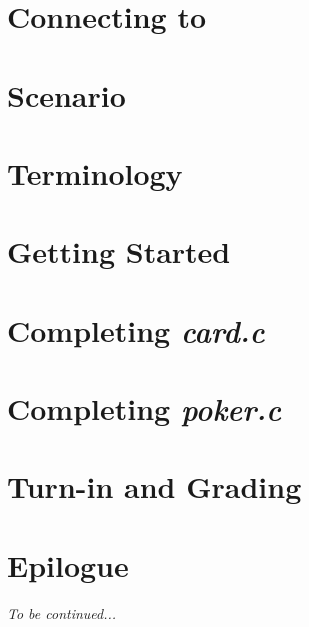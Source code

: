 




\renewcommand{\labnumber}{\pokerlabnumber}
\renewcommand{\labname}{C Programming Familiarization Lab}
\renewcommand{\shortlabname}{pokerlab}
\renewcommand{\collaborationrules}{\pokerlabcollaboration}
\renewcommand{\duedate}{\pokerlabdue}
\pagelayout

\labidentifier



\section{Connecting to \runtimeenvironment} \label{sec:connecting}  

\softwareengineeringfrontmatter

\section*{Scenario}                                                 \MeetArchie

\section{Terminology} \label{sec:terminology}                       

\section{Getting Started} \label{sec:gettingstarted}                

\section{Completing \textit{card.c}} \label{sec:completingcard}     

\section{Completing \textit{poker.c}} \label{sec:completingpoker}   

\section{Turn-in and Grading}                                       

\section*{Epilogue}                                                 \GetHired

\textit{To be continued...}


